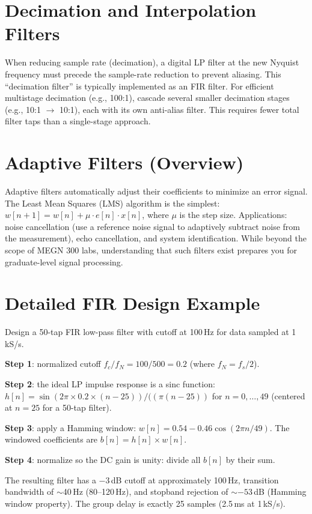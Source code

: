 \documentclass[11pt,letterpaper,twoside,openany]{book}
\begin{document}
\section{Decimation and Interpolation Filters}
When reducing sample rate (decimation), a digital LP filter at the new Nyquist frequency must precede the sample-rate reduction to prevent aliasing. This ``decimation filter'' is typically implemented as an FIR filter. For efficient multistage decimation (e.g., 100:1), cascade several smaller decimation stages (e.g., 10:1 $\to$ 10:1), each with its own anti-alias filter. This requires fewer total filter taps than a single-stage approach.

\section{Adaptive Filters (Overview)}
Adaptive filters automatically adjust their coefficients to minimize an error signal. The Least Mean Squares (LMS) algorithm is the simplest: $w[n+1] = w[n] + \mu \cdot e[n] \cdot x[n]$, where $\mu$ is the step size. Applications: noise cancellation (use a reference noise signal to adaptively subtract noise from the measurement), echo cancellation, and system identification. While beyond the scope of MEGN 300 labs, understanding that such filters exist prepares you for graduate-level signal processing.
\section{Detailed FIR Design Example}
Design a 50-tap FIR low-pass filter with cutoff at 100\,Hz for data sampled at 1\,kS/s.

\textbf{Step 1}: normalized cutoff $f_c/f_N = 100/500 = 0.2$ (where $f_N = f_s/2$).

\textbf{Step 2}: the ideal LP impulse response is a sinc function: $h[n] = \sin(2\pi \times 0.2 \times (n - 25))/((\pi(n-25))$ for $n = 0, \ldots, 49$ (centered at $n = 25$ for a 50-tap filter).

\textbf{Step 3}: apply a Hamming window: $w[n] = 0.54 - 0.46\cos(2\pi n/49)$. The windowed coefficients are $b[n] = h[n] \times w[n]$.

\textbf{Step 4}: normalize so the DC gain is unity: divide all $b[n]$ by their sum.

The resulting filter has a $-3$\,dB cutoff at approximately 100\,Hz, transition bandwidth of $\sim$40\,Hz (80--120\,Hz), and stopband rejection of $\sim$$-53$\,dB (Hamming window property). The group delay is exactly 25 samples (2.5\,ms at 1\,kS/s).
\end{document}
